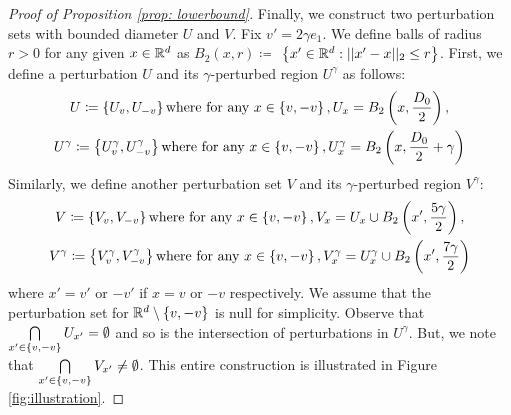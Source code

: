 \begin{proof}[Proof of Proposition \ref{prop: lowerbound}]
Finally, we construct two perturbation sets with bounded diameter $U$ and $V$. Fix $v' = 2\gamma e_1$.
We define balls of radius $r>0$ for any given $x \in \mathbb{R}^d$ as $B_2(x, r)\coloneqq$ $\left\{x' \in \mathbb{R}^d: ||x' - x||_2 \le r\right\}$. First, we define a perturbation $U$ and its $\gamma$-perturbed region $U^\gamma$ as follows:
\begin{gather*}
 U \coloneqq \left\{U_{v},U_{-v}\right\} \textnormal{where for any } x \in \left\{v,-v\right\}, U_{x} = B_2 \left( {x, \frac{D_0}{2}} \right) ,\\
 U^{\gamma}\coloneqq \left\{U_{v}^\gamma,U_{-v}^\gamma\right\} \textnormal{where for any } x \in \left\{v,-v\right\}, U_{x}^{\gamma} = B_2 \left( {x, \frac{D_0}{2} +\gamma} \right) 
\end{gather*}
Similarly, we define another perturbation set $V$ and its $\gamma$-perturbed region $V^{\gamma}$:
\begin{gather*}
V\coloneqq \left\{V_{v},V_{-v}\right\} \textnormal{where for any } x \in \left\{v,-v\right\}, V_{x} = U_{x}\cup B_2 \left( {x',\frac{5\gamma}{2}} \right) ,\\
V^{\gamma}\coloneqq \left\{V_{v}^\gamma,V_{-v}^\gamma\right\} \textnormal{where for any } x \in \left\{v,-v\right\}, V_{x}^\gamma = U_{x}^\gamma \cup B_2 \left( {x',\frac{7\gamma}{2}} \right) 
\end{gather*}
where $x' = v'$ or $-v'$ if $x = v$ or $-v$ respectively. We assume that the perturbation set for $\mathbb{R}^d\setminus \left\{v,-v\right\}$ is null for simplicity. 
Observe that $\bigcap\limits_{x' \in \left\{v,-v\right\}} U_{x'} = \emptyset$ and so is the intersection of perturbations in $U^\gamma$.
But, we note that $\bigcap\limits_{x' \in \left\{v,-v\right\}} V_{x'} \not= \emptyset$. This entire construction is illustrated in Figure \ref{fig:illustration}.


\end{proof}
